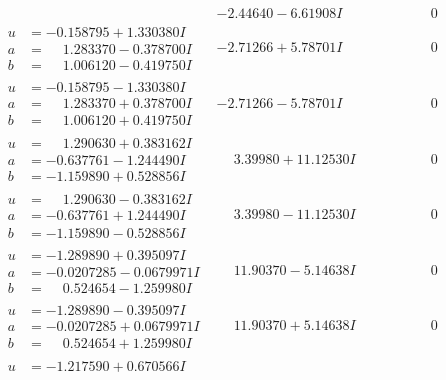 \documentclass[1p]{elsarticle_modified}
\theoremstyle{definition}
\begin{document}
$$\begin{array}{c|c|c}
 & -2.44640 - 6.61908 I & \phantom{-0.000000 } 0 \\ \hline\begin{aligned}
u &= -0.158795 + 1.330380 I \\
a &= \phantom{-}1.283370 - 0.378700 I \\
b &= \phantom{-}1.006120 - 0.419750 I\end{aligned}
 & -2.71266 + 5.78701 I & \phantom{-0.000000 } 0 \\ \hline\begin{aligned}
u &= -0.158795 - 1.330380 I \\
a &= \phantom{-}1.283370 + 0.378700 I \\
b &= \phantom{-}1.006120 + 0.419750 I\end{aligned}
 & -2.71266 - 5.78701 I & \phantom{-0.000000 } 0 \\ \hline\begin{aligned}
u &= \phantom{-}1.290630 + 0.383162 I \\
a &= -0.637761 - 1.244490 I \\
b &= -1.159890 + 0.528856 I\end{aligned}
 & \phantom{-}3.39980 + 11.12530 I & \phantom{-0.000000 } 0 \\ \hline\begin{aligned}
u &= \phantom{-}1.290630 - 0.383162 I \\
a &= -0.637761 + 1.244490 I \\
b &= -1.159890 - 0.528856 I\end{aligned}
 & \phantom{-}3.39980 - 11.12530 I & \phantom{-0.000000 } 0 \\ \hline\begin{aligned}
u &= -1.289890 + 0.395097 I \\
a &= -0.0207285 - 0.0679971 I \\
b &= \phantom{-}0.524654 - 1.259980 I\end{aligned}
 & \phantom{-}11.90370 - 5.14638 I & \phantom{-0.000000 } 0 \\ \hline\begin{aligned}
u &= -1.289890 - 0.395097 I \\
a &= -0.0207285 + 0.0679971 I \\
b &= \phantom{-}0.524654 + 1.259980 I\end{aligned}
 & \phantom{-}11.90370 + 5.14638 I & \phantom{-0.000000 } 0 \\ \hline\begin{aligned}
u &= -1.217590 + 0.670566 I \\

\end{aligned}
\end{array}$$
\end{document}
